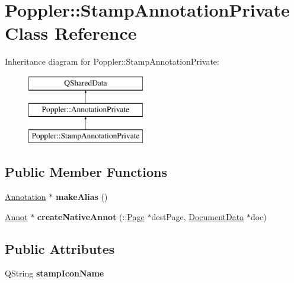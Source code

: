 \hypertarget{class_poppler_1_1_stamp_annotation_private}{}\section{Poppler\+:\+:Stamp\+Annotation\+Private Class Reference}
\label{class_poppler_1_1_stamp_annotation_private}
Inheritance diagram for Poppler\+:\+:Stamp\+Annotation\+Private\+:\begin{figure}[H]
\begin{center}
\leavevmode
\includegraphics[height=3.000000cm]{class_poppler_1_1_stamp_annotation_private}
\end{center}
\end{figure}
\subsection*{Public Member Functions}
\begin{DoxyCompactItemize}
\item 
\mbox{\label{class_poppler_1_1_stamp_annotation_private_a10b7100331392d32ea13b648a2981c6e}} 
\hyperlink{class_poppler_1_1_annotation}{Annotation} $\ast$ {\bfseries make\+Alias} ()
\item 
\mbox{\label{class_poppler_1_1_stamp_annotation_private_a2dcdbd75901052ca299ae5ee4b1427ee}} 
\hyperlink{class_annot}{Annot} $\ast$ {\bfseries create\+Native\+Annot} (\+::\hyperlink{class_poppler_1_1_page}{Page} $\ast$dest\+Page, \hyperlink{class_poppler_1_1_document_data}{Document\+Data} $\ast$doc)
\end{DoxyCompactItemize}
\subsection*{Public Attributes}
\begin{DoxyCompactItemize}
\item 
\mbox{\label{class_poppler_1_1_stamp_annotation_private_af3cfcf4093b59d873b98168d8c217d0f}} 
Q\+String {\bfseries stamp\+Icon\+Name}
\end{DoxyCompactItemize}
